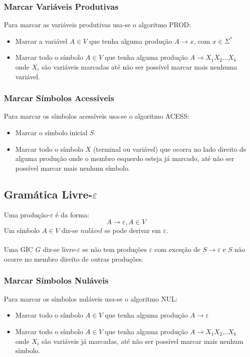 \documentclass[10pt,a4paper]{report}
\begin{document}
\subsubsection{Marcar Variáveis Produtivas}
Para marcar as variáveis produtivas usa-se o algoritmo PROD:
\begin{itemize}
\item Marcar a variável $A \in V$ que tenha alguma produção $A \rightarrow x$, com $x \in \Sigma^*$
\item Marcar todo o símbolo $A \in V$ que tenha alguma produção $A \rightarrow X_1X_2...X_k$ onde $X_i$ são variáveis marcadas até não ser possível marcar mais nenhuma variável.
\end{itemize}
\subsubsection{Marcar Símbolos Acessíveis}
Para marcar os símbolos acessíveis usa-se o algoritmo ACESS:
\begin{itemize}
\item Marcar o símbolo inicial $S$
\item Marcar todo o símbolo $X$ (terminal ou variável) que ocorra no lado direito de alguma produção onde o membro esquerdo esteja já marcado, até não ser possível marcar mais nenhum símbolo.
\end{itemize}
\subsection{Gramática Livre-$\varepsilon$}
Uma produção-$\varepsilon$ é da forma:
$$
A \rightarrow \varepsilon, A \in V
$$
Um símbolo $A \in V$ diz-se $nulável$ se pode derivar em $\varepsilon$.\\
\\
Uma GIC $G$ diz-se livre-$\varepsilon$ se não tem produções $\varepsilon$ com exceção de $S \rightarrow \varepsilon$ e $S$ não ocorre no membro direito de outras produções.
\subsubsection{Marcar Símbolos Nuláveis}
Para marcar os símbolos nuláveis usa-se o algoritmo NUL:
\begin{itemize}
\item Marcar todo o símbolo $A \in V$ que tenha alguma produção $A \rightarrow \varepsilon$
\item Marcar todo o símbolo $A \in V$ que tenha alguma produção $A \rightarrow X_1X_2...X_k$ onde $X_i$ são variáveis já marcadas, até não ser possível marcar mais nenhum símbolo.
\end{itemize}
\end{document}
